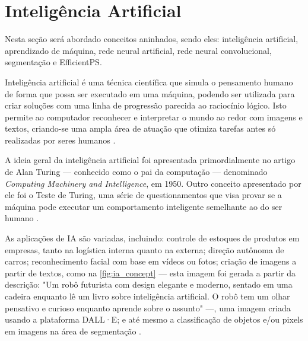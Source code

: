 \section{Inteligência Artificial}

Nesta seção será abordado conceitos aninhados, sendo eles: inteligência artificial, aprendizado de máquina, rede neural artificial, rede neural convolucional, segmentação e EfficientPS.

Inteligência artificial é uma técnica científica que simula o pensamento humano de forma que possa ser executado em uma máquina, podendo ser utilizada para criar soluções com uma linha de progressão parecida ao raciocínio lógico. Isto permite ao computador reconhecer e interpretar o mundo ao redor com imagens e textos, criando-se uma ampla área de atuação que otimiza tarefas antes só realizadas por seres humanos \space\cite{ia_aliada_ou_inimiga}.



A ideia geral da inteligência artificial foi apresentada primordialmente no artigo de Alan Turing — conhecido como o pai da computação — denominado \textit{Computing Machinery and Intelligence}, em 1950. Outro conceito apresentado por ele foi o Teste de Turing, uma série de questionamentos que visa provar se a máquina pode executar um comportamento inteligente semelhante ao do ser humano \space\cite{NationalGeographic2023}.

As aplicações de IA são variadas, incluindo: controle de estoques de produtos em empresas, tanto na logística interna quanto na externa; direção autônoma de carros; reconhecimento facial com base em vídeos ou fotos; criação de imagens a partir de textos, como na \cref{fig:ia_concept} — esta imagem foi gerada a partir da descrição: "Um robô futurista com design elegante e moderno, sentado em uma cadeira enquanto lê um livro sobre inteligência artificial. O robô tem um olhar pensativo e curioso enquanto aprende sobre o assunto" —, uma imagem criada usando a plataforma DALL·E; e até mesmo a classificação de objetos e/ou pixels em imagens na área de segmentação \space\cite{Stefanini, OpenAI2021}.

